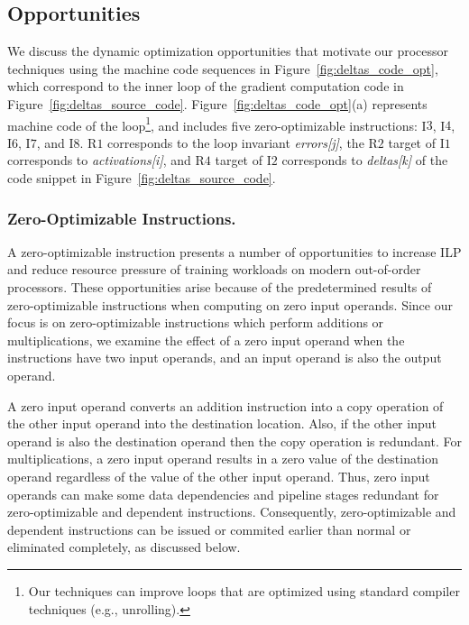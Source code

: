 \subsection{Opportunities}

We discuss the dynamic optimization opportunities that motivate our processor techniques using the machine code sequences in Figure~\ref{fig:deltas_code_opt}, which correspond to the inner loop of the gradient computation code in Figure~\ref{fig:deltas_source_code}.    Figure~\ref{fig:deltas_code_opt}(a) represents machine code of the loop\footnote{Our techniques can improve loops that are optimized using standard compiler techniques (e.g., unrolling).}, and includes five zero-optimizable instructions: I$3$, I$4$, I$6$, I$7$, and I$8$.  
R$1$ corresponds to the loop invariant \emph{errors[j]}, the R$2$ target of I$1$ corresponds to \emph{activations[i]}, and R$4$ target of I$2$ corresponds to \emph{deltas[k]} of the code snippet in Figure~\ref{fig:deltas_source_code}.

\subsubsection{Zero-Optimizable Instructions.} A zero-optimizable instruction presents a number of opportunities to increase ILP and reduce resource pressure of training workloads on modern out-of-order processors.  These opportunities arise because of the predetermined results of zero-optimizable instructions when computing on zero input operands.  Since our focus is on zero-optimizable instructions which perform additions or multiplications, we examine the effect of a zero input operand when the instructions have two input operands, and an input operand is also the output operand. 

A zero input operand converts an addition instruction into a copy operation of the other input operand into the destination location. Also, if the other input operand is also the destination operand then the copy operation is redundant.  For multiplications, a zero input operand results in a zero value of the destination operand regardless of the value of the other input operand.  Thus, zero input operands can make some data dependencies and pipeline stages redundant for zero-optimizable and dependent instructions.  Consequently, zero-optimizable and dependent instructions can be issued or commited earlier than normal or eliminated completely, as discussed below. 

